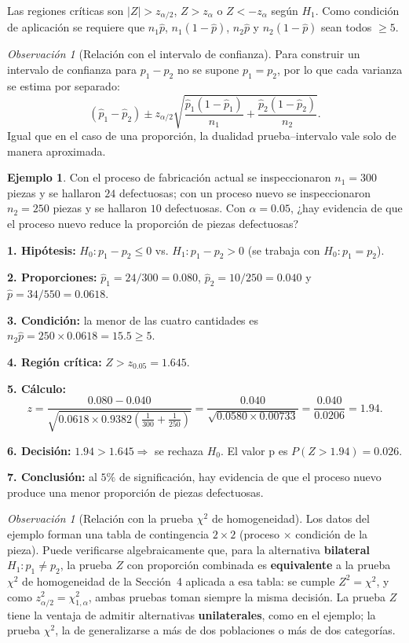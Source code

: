 \documentclass[11pt,a4paper]{article}
\theoremstyle{plain}
\theoremstyle{definition}
\newtheorem{ejemplo}[teorema]{Ejemplo}
\theoremstyle{remark}
\newtheorem{observacion}[teorema]{Observación}
\begin{document}
Las regiones críticas son $|Z|>z_{\alpha/2}$, $Z>z_\alpha$ o $Z<-z_\alpha$ según $H_1$. Como condición de aplicación se requiere que $n_1\hat p$, $n_1(1-\hat p)$, $n_2\hat p$ y $n_2(1-\hat p)$ sean todos $\ge5$.

\begin{observacion}[Relación con el intervalo de confianza]
Para construir un intervalo de confianza para $p_1-p_2$ no se supone $p_1=p_2$, por lo que cada varianza se estima por separado:
\[
(\hat p_1-\hat p_2)\pm z_{\alpha/2}\sqrt{\frac{\hat p_1(1-\hat p_1)}{n_1}+\frac{\hat p_2(1-\hat p_2)}{n_2}}.
\]
Igual que en el caso de una proporción, la dualidad prueba–intervalo vale solo de manera aproximada.
\end{observacion}

\begin{ejemplo}
Con el proceso de fabricación actual se inspeccionaron $n_1=300$ piezas y se hallaron $24$ defectuosas; con un proceso nuevo se inspeccionaron $n_2=250$ piezas y se hallaron $10$ defectuosas. Con $\alpha=0.05$, ¿hay evidencia de que el proceso nuevo reduce la proporción de piezas defectuosas?

\textbf{1. Hipótesis:} $H_0:p_1-p_2\le0$ vs. $H_1:p_1-p_2>0$ (se trabaja con $H_0:p_1=p_2$).

\textbf{2. Proporciones:} $\hat p_1=24/300=0.080$, $\hat p_2=10/250=0.040$ y $\hat p=34/550=0.0618$.

\textbf{3. Condición:} la menor de las cuatro cantidades es $n_2\hat p=250\times0.0618=15.5\ge5$.

\textbf{4. Región crítica:} $Z>z_{0.05}=1.645$.

\textbf{5. Cálculo:}
\[
z=\frac{0.080-0.040}{\sqrt{0.0618\times0.9382\left(\tfrac{1}{300}+\tfrac{1}{250}\right)}}=\frac{0.040}{\sqrt{0.0580\times0.00733}}=\frac{0.040}{0.0206}=1.94.
\]

\textbf{6. Decisión:} $1.94>1.645\Rightarrow$ se rechaza $H_0$. El valor p es $P(Z>1.94)=0.026$.

\textbf{7. Conclusión:} al $5\%$ de significación, hay evidencia de que el proceso nuevo produce una menor proporción de piezas defectuosas.
\end{ejemplo}

\begin{observacion}[Relación con la prueba $\chi^2$ de homogeneidad]
Los datos del ejemplo forman una tabla de contingencia $2\times2$ (proceso $\times$ condición de la pieza). Puede verificarse algebraicamente que, para la alternativa \textbf{bilateral} $H_1:p_1\neq p_2$, la prueba $Z$ con proporción combinada es \textbf{equivalente} a la prueba $\chi^2$ de homogeneidad de la Sección~4 aplicada a esa tabla: se cumple $Z^2=\chi^2$, y como $z_{\alpha/2}^2=\chi^2_{1,\alpha}$, ambas pruebas toman siempre la misma decisión. La prueba $Z$ tiene la ventaja de admitir alternativas \textbf{unilaterales}, como en el ejemplo; la prueba $\chi^2$, la de generalizarse a más de dos poblaciones o más de dos categorías.
\end{observacion}
\end{document}
